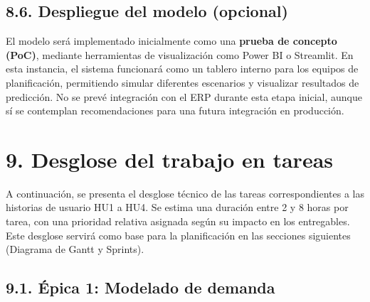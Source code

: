 \documentclass[
11pt, %
]{charter}
\begin{document}
\subsection*{8.6. Despliegue del modelo (opcional)}
El modelo será implementado inicialmente como una \textbf{prueba de concepto (PoC)}, mediante herramientas de visualización como Power BI o Streamlit. En esta instancia, el sistema funcionará como un tablero interno para los equipos de planificación, permitiendo simular diferentes escenarios y visualizar resultados de predicción. No se prevé integración con el ERP durante esta etapa inicial, aunque sí se contemplan recomendaciones para una futura integración en producción.


\section{9. Desglose del trabajo en tareas}
\label{sec:wbs}

A continuación, se presenta el desglose técnico de las tareas correspondientes a las historias de usuario HU1 a HU4. Se estima una duración entre 2 y 8 horas por tarea, con una prioridad relativa asignada según su impacto en los entregables. Este desglose servirá como base para la planificación en las secciones siguientes (Diagrama de Gantt y Sprints).

\subsection*{9.1. Épica 1: Modelado de demanda}
\end{document}
